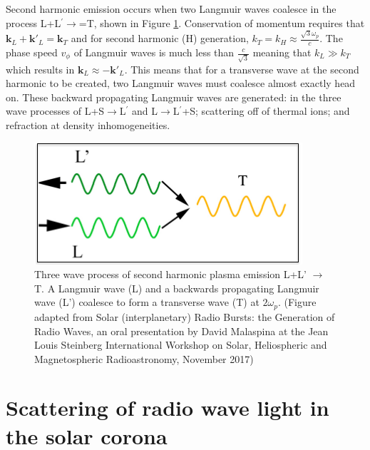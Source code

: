 Second harmonic emission occurs when two Langmuir waves coalesce in the process L+L$^\prime \rightarrow$=T, shown in Figure \ref{fig:Hemission}. Conservation of momentum requires that $\mathbf{k}_L + \mathbf{k'}_L = \mathbf{k}_T$ and for second harmonic (H) generation, $k_T=k_H \approx \frac{\sqrt{3} \omega_p}{c}$. The phase speed $v_\phi$ of Langmuir waves is much less than $\frac{c}{\sqrt{3}}$ meaning that $k_L \gg k_T$ which results in $\mathbf{k}_L \approx -\mathbf{k'}_L$. This means that for a transverse wave at the second harmonic to be created, two Langmuir waves must coalesce almost exactly head on. These backward propagating Langmuir waves are generated: in the three wave processes of L+S$\rightarrow$L$^\prime$ and L$\rightarrow$L$^\prime$+S; scattering off of thermal ions; and refraction at density inhomogeneities.
 \begin{figure}

     \centering
     \includegraphics[width=0.5\columnwidth]{Images/Harmonic_emission_Lwaves.png}
     \caption[Three wave process of second harmonic plasma emission L+L' $\rightarrow$ T]{Three wave process of second harmonic plasma emission L+L' $\rightarrow$ T. A Langmuir wave (L) and a backwards propagating Langmuir wave (L') coalesce to form a transverse wave (T) at $2 \omega_p$. (Figure adapted from Solar (interplanetary) Radio Bursts: the Generation of Radio Waves,	an oral presentation by David Malaspina at the Jean Louis Steinberg International Workshop on Solar, Heliospheric and Magnetospheric Radioastronomy, November 2017)}
     \label{fig:Hemission}
 \end{figure}
 
\section{Scattering of radio wave light in the solar corona}
\label{sec:scattering_theory}

